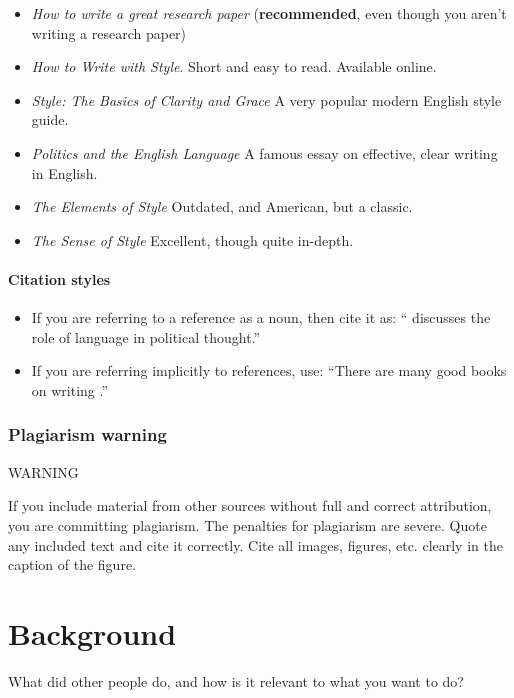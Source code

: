 \documentclass{l4proj}
\begin{document}
\begin{itemize}
    \item
    \emph{How to write a great research paper} (\textbf{recommended}, even though you aren't writing a research paper)
    \item
    \emph{How to Write with Style}. Short and easy to read. Available online.
    \item
    \emph{Style: The Basics of Clarity and Grace} A very popular modern English style guide.
    \item
    \emph{Politics and the English Language}  A famous essay on effective, clear writing in English.
    \item
    \emph{The Elements of Style} Outdated, and American, but a classic.
    \item
    \emph{The Sense of Style} \cite{Pin15} Excellent, though quite in-depth.
\end{itemize}

\subsubsection{Citation styles}

\begin{itemize}
\item If you are referring to a reference as a noun, then cite it as: ``\citet{Orw68} discusses the role of language in political thought.''
\item If you are referring implicitly to references, use: ``There are many good books on writing \citep{Orw68, Wil09, Pin15}.''
\end{itemize}
\subsection{Plagiarism warning}

\begin{highlight_title}{WARNING}
    
    If you include material from other sources without full and correct attribution, you are committing plagiarism. The penalties for plagiarism are severe.
    Quote any included text and cite it correctly. Cite all images, figures, etc. clearly in the caption of the figure.
\end{highlight_title}


\chapter{Background}
What did other people do, and how is it relevant to what you want to do?
\end{document}
